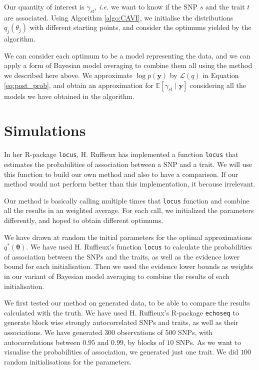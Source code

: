 \documentclass{article}
\numberwithin{equation}{section}
\begin{document}
Our quantity of interest is $\gamma_{st}$, \textit{i.e.} we want to know if the SNP $s$ and the trait $t$ are associated. Using Algorithm \ref{algo:CAVI}, we initialise the distributions $q_j(\theta_j)$ with different starting points, and consider the optimums yielded by the algorithm.

We can consider each optimum to be a model representing the data, and we can apply a form of Bayesian model averaging to combine them all using the method we described here above. We approximate $\log p(\boldsymbol{y})$ by $\mathcal{L}(q)$ in Equation \ref{eq:post_prob}, and obtain an approximation for $\mathbb{E}\left[\gamma_{st}\mid \boldsymbol{y}\right]$ considering all the models we have obtained in the algorithm.
\newpage
\section{Simulations}
In her R-package \texttt{locus}, H. Ruffieux has implemented a function \texttt{locus} that estimates the probabilities of association between a SNP and a trait. We will use this function to build our own method and also to have a comparison. If our method would not perform better than this implementation, it because irrelevant.

Our method is basically calling multiple times that \texttt{locus} function and combine all the results in an weighted average. For each call, we initialized the parameters differently, and hoped to obtain different optimums.

We have drawn at random the initial parameters for the optimal approximations $q^*(\boldsymbol{\theta})$. We have used H. Ruffieux's function \texttt{locus} to calculate the probabilities of association between the SNPs and the traits, as well as the evidence lower bound for each initialisation. Then we used the evidence lower bounds as weights in our variant of Bayesian model averaging to combine the results of each initialisation.

We first tested our method on generated data, to be able to compare the results calculated with the truth. We have used H. Ruffieux's R-package \texttt{echoseq} to generate block wise strongly autocorrelated SNPs and traits, as well as their associations. We have generated $300$ observations of $500$ SNPs, with autocorrelations between $0.95$ and $0.99$, by blocks of $10$ SNPs. As we want to visualise the probabilities of association, we generated just one trait. We did $100$ random initialisations for the parameters.
\end{document}
